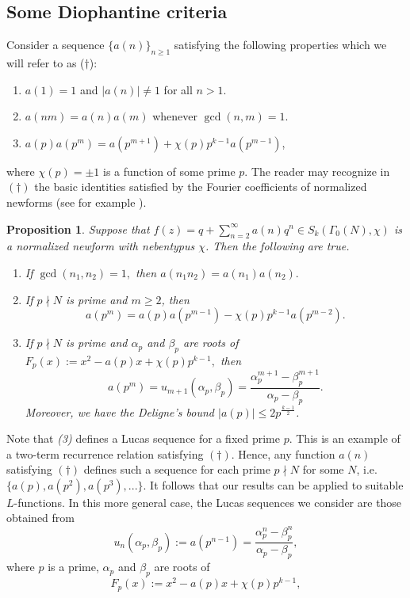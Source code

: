 \documentclass[12pt]{amsart}
\newtheorem{prop}[thm]{Proposition}
\numberwithin{equation}{section}
\begin{document}
\subsection{Some Diophantine criteria}{\label{sec2.2}}
Consider a sequence $\{a(n)\}_{n\geq 1}$ satisfying the following properties which we will refer to as ($\dagger$):
\begin{enumerate}
    \item $a(1)=1$ and $|a(n)|\neq 1$ for all $n>1$. \label{prop1}
    \item $a(nm)=a(n)a(m)$ whenever $\gcd(n,m)=1$. \label{prop2}
    \item $a(p)a(p^m)=a(p^{m+1})+\chi(p)p^{k-1}a(p^{m-1})$, \label{prop3}
\end{enumerate}
where $\chi(p)=\pm 1$ is a function of some prime $p$. The reader may recognize in $(\dagger)$ the basic identities satisfied by the Fourier coefficients of normalized newforms (see for example \cite{CoSt,Ono}).
\begin{prop}\label{Newforms} Suppose that $f(z)=q+\sum_{n=2}^{\infty}a(n)q^n\in S_{k}(\Gamma_0(N),\chi)$ is a normalized newform with nebentypus $\chi$.
Then the following are true.
\begin{enumerate}
\item If $\gcd(n_1,n_2)=1,$ then $a(n_1 n_2)=a(n_1)a(n_2).$
\item If $p\nmid N$ is prime and $m\geq 2$, then $$a(p^m)=a(p)a(p^{m-1})-\chi(p)p^{k-1}a(p^{m-2}).
$$
\item If $p\nmid N$ is prime and $\alpha_p$ and $\beta_p$ are roots of $F_p(x):=x^2-a(p)x+\chi(p)p^{k-1},$ then
$$
   a(p^m)=u_{m+1}(\alpha_p,\beta_p)=\frac{\alpha_p^{m+1}-\beta_p^{m+1}}{\alpha_p-\beta_p}.
$$   
Moreover, we have the Deligne's bound $|a(p)|\leq 2p^{\frac{k-1}{2}}$.
\end{enumerate}
\end{prop}
Note that \textit{(3)} defines a Lucas sequence for a fixed prime $p$. This is an example of a two-term recurrence relation satisfying $(\dagger)$. Hence, any function $a(n)$ satisfying $(\dagger)$ defines such a sequence for each prime $p\nmid N$ for some $N$, i.e. $\{a(p),a(p^2),a(p^3),...\}$. It follows that our results can be applied to suitable $L$-functions. In this more general case, the Lucas sequences we consider are those obtained from $$u_{n}(\alpha_p,\beta_p):=a(p^{n-1})=\frac{\alpha_p^{n}-\beta_p^{n}}{\alpha_p-\beta_p},$$ where $p$ is a prime, $\alpha_p$ and $\beta_p$ are roots of \begin{equation}
    F_p(x):=x^2-a(p)x+\chi(p)p^{k-1},
\end{equation} 
\end{document}
